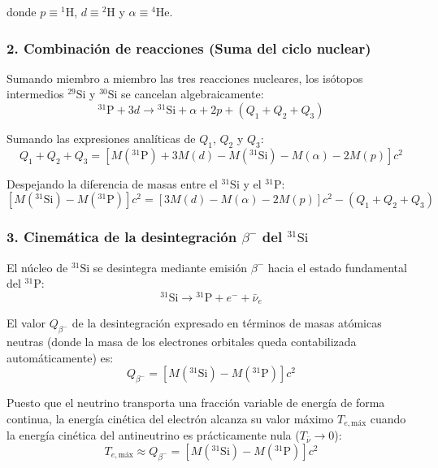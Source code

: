 \begin{problema}
donde $p \equiv {}^1\text{H}$, $d \equiv {}^2\text{H}$ y $\alpha \equiv {}^4\text{He}$.

\subsubsection*{2. Combinación de reacciones (Suma del ciclo nuclear)}

Sumando miembro a miembro las tres reacciones nucleares, los isótopos intermedios ${}^{29}\text{Si}$ y ${}^{30}\text{Si}$ se cancelan algebraicamente:
\begin{equation}
{}^{31}\text{P} + 3d \longrightarrow {}^{31}\text{Si} + \alpha + 2p + (Q_1 + Q_2 + Q_3)
\end{equation}

Sumando las expresiones analíticas de $Q_1$, $Q_2$ y $Q_3$:
\begin{equation}
Q_1 + Q_2 + Q_3 = \left[ M({}^{31}\text{P}) + 3 M(d) - M({}^{31}\text{Si}) - M(\alpha) - 2 M(p) \right] c^2
\end{equation}

Despejando la diferencia de masas entre el ${}^{31}\text{Si}$ y el ${}^{31}\text{P}$:
\begin{equation}
\left[ M({}^{31}\text{Si}) - M({}^{31}\text{P}) \right] c^2 = \left[ 3 M(d) - M(\alpha) - 2 M(p) \right] c^2 - (Q_1 + Q_2 + Q_3)
\end{equation}

\subsubsection*{3. Cinemática de la desintegración $\beta^-$ del ${}^{31}\text{Si}$}

El núcleo de ${}^{31}\text{Si}$ se desintegra mediante emisión $\beta^-$ hacia el estado fundamental del ${}^{31}\text{P}$:
\begin{equation}
{}^{31}\text{Si} \longrightarrow {}^{31}\text{P} + e^- + \bar{\nu}_e
\end{equation}

El valor $Q_{\beta^-}$ de la desintegración expresado en términos de masas atómicas neutras (donde la masa de los electrones orbitales queda contabilizada automáticamente) es:
\begin{equation}
Q_{\beta^-} = \left[ M({}^{31}\text{Si}) - M({}^{31}\text{P}) \right] c^2
\end{equation}

Puesto que el neutrino transporta una fracción variable de energía de forma continua, la energía cinética del electrón alcanza su valor máximo $T_{e,\text{máx}}$ cuando la energía cinética del antineutrino es prácticamente nula ($T_{\bar{\nu}} \to 0$):
\begin{equation}
T_{e,\text{máx}} \approx Q_{\beta^-} = \left[ M({}^{31}\text{Si}) - M({}^{31}\text{P}) \right] c^2
\end{equation}


\end{problema}
